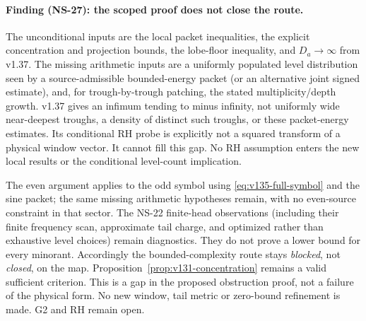 \paragraph{Finding (NS-27): the scoped proof does not close the route.}
The unconditional inputs are the local packet inequalities, the explicit
concentration and projection bounds, the lobe-floor inequality, and
$D_a\to\infty$ from v1.37. The missing arithmetic inputs are a
uniformly populated level distribution seen by a source-admissible
bounded-energy packet (or an alternative joint signed estimate), and,
for trough-by-trough patching, the stated multiplicity/depth growth.
v1.37 gives an infimum tending to minus infinity, not uniformly wide
near-deepest troughs, a density of distinct such troughs, or these
packet-energy estimates. Its conditional RH probe is explicitly not
a squared transform of a physical window vector. It cannot fill this
gap. No RH assumption enters the new local results or the conditional
level-count implication.

The even argument applies to the odd symbol using
\eqref{eq:v135-full-symbol} and the sine packet; the same missing
arithmetic hypotheses remain, with no even-source constraint in that
sector. The NS-22 finite-head observations (including their finite
frequency scan, approximate tail charge, and optimized rather than
exhaustive level choices) remain diagnostics. They do not prove a
lower bound for every minorant. Accordingly the bounded-complexity
route stays \emph{blocked}, not \emph{closed}, on the map.
Proposition~\ref{prop:v131-concentration} remains a valid sufficient
criterion. This is a gap in the proposed obstruction proof, not a
failure of the physical form. No new window, tail metric or zero-bound
refinement is made. G2 and RH remain open.

